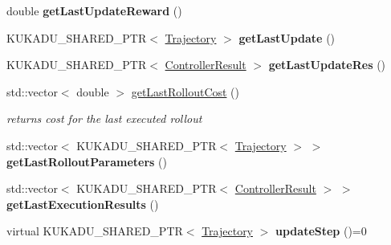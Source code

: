 \begin{DoxyCompactItemize}
\item 
double {\bfseries get\+Last\+Update\+Reward} ()\hypertarget{classkukadu_1_1GeneralReinforcer_aa65904e99bffab1272d49b01d515a670}{}\label{classkukadu_1_1GeneralReinforcer_aa65904e99bffab1272d49b01d515a670}

\item 
K\+U\+K\+A\+D\+U\+\_\+\+S\+H\+A\+R\+E\+D\+\_\+\+P\+TR$<$ \hyperlink{classkukadu_1_1Trajectory}{Trajectory} $>$ {\bfseries get\+Last\+Update} ()\hypertarget{classkukadu_1_1GeneralReinforcer_a19213b562d0a5a0320347e51ae108f9e}{}\label{classkukadu_1_1GeneralReinforcer_a19213b562d0a5a0320347e51ae108f9e}

\item 
K\+U\+K\+A\+D\+U\+\_\+\+S\+H\+A\+R\+E\+D\+\_\+\+P\+TR$<$ \hyperlink{classkukadu_1_1ControllerResult}{Controller\+Result} $>$ {\bfseries get\+Last\+Update\+Res} ()\hypertarget{classkukadu_1_1GeneralReinforcer_a7aa17bfed379c5673d81eb17db4b4932}{}\label{classkukadu_1_1GeneralReinforcer_a7aa17bfed379c5673d81eb17db4b4932}

\item 
std\+::vector$<$ double $>$ \hyperlink{classkukadu_1_1GeneralReinforcer_a5c26cdef91f856f34c528547eee94472}{get\+Last\+Rollout\+Cost} ()\hypertarget{classkukadu_1_1GeneralReinforcer_a5c26cdef91f856f34c528547eee94472}{}\label{classkukadu_1_1GeneralReinforcer_a5c26cdef91f856f34c528547eee94472}

\begin{DoxyCompactList}\small\item\em returns cost for the last executed rollout \end{DoxyCompactList}\item 
std\+::vector$<$ K\+U\+K\+A\+D\+U\+\_\+\+S\+H\+A\+R\+E\+D\+\_\+\+P\+TR$<$ \hyperlink{classkukadu_1_1Trajectory}{Trajectory} $>$ $>$ {\bfseries get\+Last\+Rollout\+Parameters} ()\hypertarget{classkukadu_1_1GeneralReinforcer_a4223bf864a5fe99bd42fe92c7e453869}{}\label{classkukadu_1_1GeneralReinforcer_a4223bf864a5fe99bd42fe92c7e453869}

\item 
std\+::vector$<$ K\+U\+K\+A\+D\+U\+\_\+\+S\+H\+A\+R\+E\+D\+\_\+\+P\+TR$<$ \hyperlink{classkukadu_1_1ControllerResult}{Controller\+Result} $>$ $>$ {\bfseries get\+Last\+Execution\+Results} ()\hypertarget{classkukadu_1_1GeneralReinforcer_a1ed63236a3d31d26152ffb9f01f5363a}{}\label{classkukadu_1_1GeneralReinforcer_a1ed63236a3d31d26152ffb9f01f5363a}

\item 
virtual K\+U\+K\+A\+D\+U\+\_\+\+S\+H\+A\+R\+E\+D\+\_\+\+P\+TR$<$ \hyperlink{classkukadu_1_1Trajectory}{Trajectory} $>$ {\bfseries update\+Step} ()=0\hypertarget{classkukadu_1_1GeneralReinforcer_a2925052d641e845dba068fa03d567b20}{}\label{classkukadu_1_1GeneralReinforcer_a2925052d641e845dba068fa03d567b20}


\end{DoxyCompactItemize}
